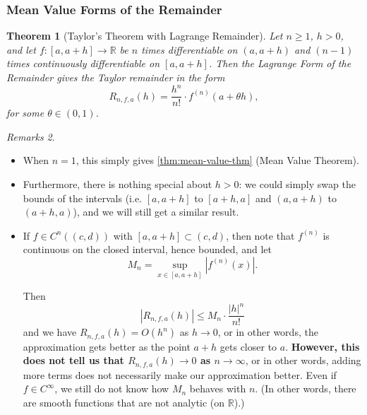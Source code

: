 \documentclass[11pt]{article}
\numberwithin{equation}{section}
\newtheorem{theorem}{Theorem}[section]
\theoremstyle{definition}
\theoremstyle{remark}
\newtheorem{remarks}[theorem]{Remarks}
\newcommand{\pqty}[1]{\left(#1\right)}
\newcommand{\abs}[1]{\left|#1\right|}
\newcommand{\ccintv}[2]{[#1,#2]}
\newcommand{\oointv}[2]{(#1,#2)}
\newcommand{\functiondomain}[3]{#1:#2\to #3}
\newcommand{\RR}{\mathbb R}
\newcommand{\bigO}{O}
\newcommand{\contClass}[1]{C^{#1}}
\newcommand{\smoothClass}{C^\infty}
\begin{document}
\subsubsection{Mean Value Forms of the Remainder}

\begin{theorem}[Taylor's Theorem with Lagrange Remainder]\label{analysis-unit-0128}
    \label{thm:taylor-thm-langrange-remainder}%
    Let \(n\ge1\), \(h>0\), and let \(\functiondomain{f}{\ccintv{a}{a + h}}{\RR}\) be \(n\) times differentiable on \(\oointv{a}{a + h}\) and \(\pqty{n - 1}\) times continuously differentiable on \(\ccintv{a}{a + h}\). Then the \emph{Lagrange Form of the Remainder} gives the Taylor remainder in the form
    \[
        R_{n, f, a} \pqty{h} = \frac{h^n}{n!} \cdot f^{\pqty{n}} \pqty{a + \theta h},
    \]
    for some \(\theta \in \oointv{0}{1}\).
\end{theorem}

\begin{remarks}\label{analysis-unit-0129}
    \begin{itemize}
        \item When \(n = 1\), this simply gives \autoref{thm:mean-value-thm} (Mean Value Theorem).
        \item Furthermore, there is nothing special about \(h > 0\): we could simply swap the bounds of the intervals (i.e. \(\ccintv{a}{a + h}\) to \(\ccintv{a + h}{a}\) and \(\oointv{a}{a + h}\) to \(\oointv{a + h}{a}\)), and we will still get a similar result.
        \item If \(f \in \contClass{n} \pqty{\oointv{c}{d}}\) with \(\ccintv{a}{a + h} \subset \oointv{c}{d}\), then note that \(f^{\pqty{n}}\) is continuous on the closed interval, hence bounded, and let
        \[
            M_n = \sup_{x \in \ccintv{a}{a + h}} \abs{f^{\pqty{n}} \pqty{x}}.
        \]

        Then
        \[
            \abs{R_{n, f, a} \pqty{h}} \leq M_n \cdot \frac{\abs{h}^n}{n!}
        \]
        and we have \(R_{n, f, a} \pqty{h} = \bigO \pqty{h^n}\) as \(h \to 0\), or in other words, the approximation gets better as the point \(a + h\) gets closer to \(a\). \textbf{However, this does not tell us that \(R_{n, f, a} \pqty{h} \to 0\) as \(n \to \infty\)}, or in other words, adding more terms does not necessarily make our approximation better. Even if \(f \in \smoothClass\), we still do not know how \(M_n\) behaves with \(n\). (In other words, there are smooth functions that are not analytic (on \(\RR\)).)
    \end{itemize}
\end{remarks}
\end{document}
